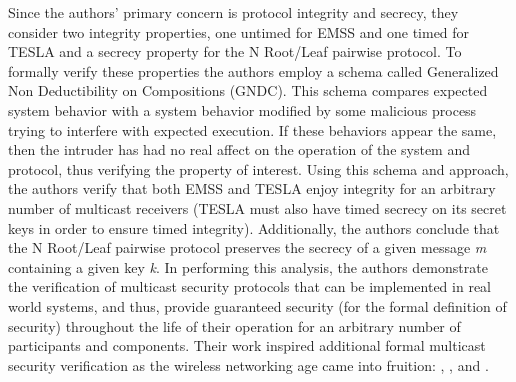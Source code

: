 \documentclass[10pt, journal]{IEEEtran}
\begin{document}
Since the authors' primary concern is protocol integrity and secrecy, they consider two integrity properties, one untimed for EMSS and one timed for \textmugreek TESLA and a secrecy property for the N Root/Leaf pairwise protocol. To formally verify these properties the authors employ a schema called Generalized Non Deductibility on Compositions (GNDC). This schema compares expected system behavior with a system behavior modified by some malicious process trying to interfere with expected execution. If these behaviors appear the same, then the intruder has had no real affect on the operation of the system and protocol, thus verifying the property of interest. Using this schema and approach, the authors verify that both EMSS and \textmugreek TESLA enjoy integrity for an arbitrary number of multicast receivers (\textmugreek TESLA must also have timed secrecy on its secret keys in order to ensure timed integrity). Additionally, the authors conclude that the N Root/Leaf pairwise protocol preserves the secrecy of a given message \textit{m} containing a given key \textit{k}.
\bigbreak
In performing this analysis, the authors demonstrate the verification of multicast security protocols that can be implemented in real world systems, and thus, provide guaranteed security (for the formal definition of security) throughout the life of their operation for an arbitrary number of participants and components. Their work inspired additional formal multicast security verification as the wireless networking age came into fruition: \cite{Martina2015}, \cite{Bella2002}, and \cite{Archer2002}. 
\bigbreak
\end{document}
